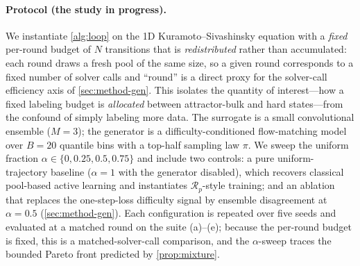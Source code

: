 \documentclass{article}
\theoremstyle{plain}
\theoremstyle{definition}
\theoremstyle{remark}
\newcommand{\pnat}{p}
\newcommand{\Rp}{\mathcal{R}_{\pnat}}
\newcommand{\unif}{\alpha}
\begin{document}
\paragraph{Protocol (the study in progress).}
We instantiate \cref{alg:loop} on the 1D Kuramoto--Sivashinsky equation \citep{sivashinsky1977} with a
\emph{fixed} per-round budget of $N$ transitions that is \emph{redistributed} rather than accumulated:
each round draws a fresh pool of the same size, so a given round corresponds to a fixed number of solver
calls and ``round'' is a direct proxy for the solver-call efficiency axis of \cref{sec:method-gen}. This
isolates the quantity of interest---how a fixed labeling budget is \emph{allocated} between attractor-bulk
and hard states---from the confound of simply labeling more data. The surrogate is a small convolutional
ensemble ($M{=}3$); the generator is a difficulty-conditioned flow-matching model over $B{=}20$ quantile
bins with a top-half sampling law $\pi$. We sweep the uniform fraction $\unif\in\{0,0.25,0.5,0.75\}$ and
include two controls: a pure uniform-trajectory baseline ($\unif{=}1$ with the generator disabled), which
recovers classical pool-based active learning and instantiates $\Rp$-style training; and an ablation that
replaces the one-step-loss difficulty signal by ensemble disagreement at $\unif{=}0.5$
(\cref{sec:method-gen}). Each configuration is repeated over five seeds and evaluated at a matched round on
the suite (a)--(e); because the per-round budget is fixed, this is a matched-solver-call comparison, and
the $\unif$-sweep traces the bounded Pareto front predicted by \cref{prop:mixture}.
\end{document}
